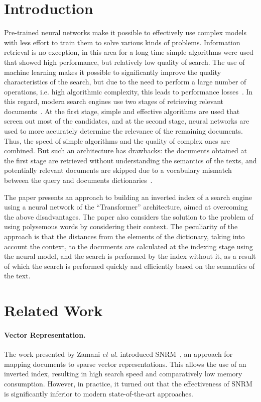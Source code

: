 \documentclass[
    twocolumn,
]{template/ceurart}
\begin{document}
    \section{Introduction}
    Pre-trained neural networks make it possible to effectively use complex models with less effort
    to train them to solve various kinds of problems.
    Information retrieval is no exception, in this area for a long time simple algorithms
    were used that showed high performance, but relatively low quality of search.
    The use of machine learning makes it possible to significantly improve the quality
    characteristics of the search, but due to the need to perform a large number of operations,
    i.e. high algorithmic complexity, this leads to performance losses~\cite{performanceLoss}.
    In this regard, modern search engines use two stages of retrieving relevant documents~\cite{multiStageRetrieval}.
    At the first stage, simple and effective algorithms are used that screen out most of the candidates,
    and at the second stage, neural networks are used to more accurately determine
    the relevance of the remaining documents.
    Thus, the speed of simple algorithms and the quality of complex ones are combined.
    But such an architecture has drawbacks: the documents obtained at the first stage are retrieved
    without understanding the semantics of the texts, and potentially relevant documents are skipped
    due to a vocabulary mismatch between the query and documents dictionaries~\cite{vocabularyMismatch1,vocabularyMismatch2}.

    The paper presents an approach to building an inverted index of a search engine using a neural network
    of the ``Transformer'' architecture, aimed at overcoming the above disadvantages.
    The paper also considers the solution to the problem of using polysemous words by considering their context.
    The peculiarity of the approach is that the distances from the elements of the dictionary,
    taking into account the context, to the documents are calculated at the indexing stage using the neural model,
    and the search is performed by the index without it, as a result of which the search is performed quickly
    and efficiently based on the semantics of the text.


    \section{Related Work}

    \paragraph{Vector Representation.}
    The work presented by Zamani \textit{et al.} introduced SNRM~\cite{snrm},
    an approach for mapping documents to sparse vector representations.
    This allows the use of an inverted index, resulting in high search speed and comparatively low memory consumption.
    However, in practice, it turned out that the effectiveness of SNRM is significantly
    inferior to modern state-of-the-art approaches.
\end{document}
